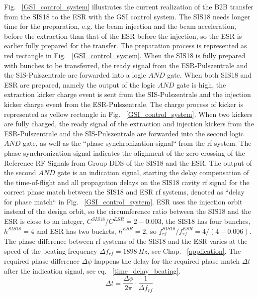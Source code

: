 Fig. ~\ref{GSI_control_system} illustrates the current realization of the B2B transfer from the SIS18 to the ESR with the GSI control system. The SIS18 needs longer time for the preparation, e.g. the beam injection and the beam acceleration, before the extraction than that of the ESR before the injection, so the ESR is earlier fully prepared for the transfer. The preparation process is represented as red rectangle in Fig. ~\ref{GSI_control_system}. When the SIS18 is fully prepared with bunches to be transferred, the ready signal from the ESR-Pulszentrale and the SIS-Pulszentrale are forwarded into a logic $\textit{AND}$ gate. When both SIS18 and ESR are prepared, namely the output of the logic $\textit{AND}$ gate is high, the extraction kicker charge event is sent from the SIS-Pulszentrale and the injection kicker charge event from the ESR-Pulszentrale. The charge process of kicker is represented as yellow rectangle in Fig. ~\ref{GSI_control_system}. When two kickers are fully charged, the ready signal of the extraction and injection kickers from the ESR-Pulszentrale and the SIS-Pulszentrale are forwarded into the second logic $\textit{AND}$ gate, as well as the ``phase synchronization signal`` from the rf system. The phase synchronization signal indicates the alignment of the zero-crossing of the Reference RF Signals from Group DDS of the SIS18 and the ESR. The output of the second $\textit{AND}$ gate is an indication signal, starting the delay compensation of the time-of-flight and all propagation delays on the SIS18 cavity rf signal for the correct phase match between the SIS18 and ESR rf systems, denoted as ``delay for phase match`` in Fig. ~\ref{GSI_control_system}. ESR uses the injection orbit instead of the design orbit, so the circumference ratio between the SIS18 and the ESR is close to an integer, $C^{\mathit{SIS18}}/C^{\mathit{ESR}}=2-0.003$, the SIS18 has four bunches, $h^{\mathit{SIS18}}=4$ and ESR has two buckets, $h^{\mathit{ESR}}=2$, so $f^{\mathit{SIS18}}_{\mathit{rf}}/f^{\mathit{ESR}}_{\mathit{rf}}=4/(4-0.006)$. The phase difference between rf systems of the SIS18 and the ESR varies at the speed of the beating frequency $\Delta f_\mathit{rf}=\SI{1898}{Hz}$, see Chap. ~\ref{application}. The required phase difference $\Delta\phi$ happens the delay for the required phase match $\Delta t$ after the indication signal, see eq. ~\ref{time_delay_beating}. 
\begin{equation}
\Delta t= \frac{\Delta \phi}{2\pi}\cdot\frac{1}{\Delta f_\mathit{rf}}\label{time_delay_beating}
\end{equation}

